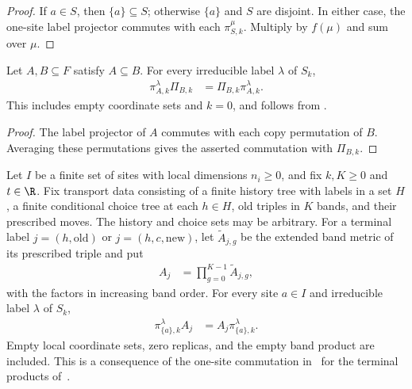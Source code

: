 \begin{proof}
    \leanok
    If $a\in S$, then $\{a\}\subseteq S$; otherwise $\{a\}$ and $S$
    are disjoint. In either case, the one-site label projector commutes
    with each $\pi^\mu_{S,k}$. Multiply by $f(\mu)$ and sum over $\mu$.
\end{proof}


\begin{theorem}
    \label{thm:nested_label_projector_symmetry}
    \leanok
    Let $A,B\subseteq F$ satisfy $A\subseteq B$. For every irreducible
    label $\lambda$ of $S_k$,
    \begin{align}
        \pi^\lambda_{A,k}\Pi_{B,k}
         & =\Pi_{B,k}\pi^\lambda_{A,k}.
    \end{align}
    This includes empty coordinate sets and $k=0$, and follows from
    \cite[Lemma~6.1(2)]{OpenAI2026AreaLaw}.
\end{theorem}

\begin{proof}
    \leanok
    The label projector of $A$ commutes with each copy permutation of
    $B$. Averaging these permutations gives the asserted commutation
    with $\Pi_{B,k}$.
\end{proof}


\begin{theorem}
    \label{thm:transport_input_singleton_label_commutation}
    \leanok
    Let $I$ be a finite set of sites with local dimensions $n_i\ge0$,
    and fix $k,K\ge0$ and $t\in\R$. Fix transport data consisting of
    a finite history tree with labels in a set $H$, a finite conditional
    choice tree at each $h\in H$, old triples in $K$ bands, and their
    prescribed moves. The history and choice sets may be arbitrary.
    For a terminal label $j=(h,\mathrm{old})$ or $j=(h,c,\mathrm{new})$,
    let $\widetilde A_{j,g}$ be the extended band metric of its prescribed
    triple and put
    \begin{align*}
        A_j & =\prod_{g=0}^{K-1}\widetilde A_{j,g},
    \end{align*}
    with the factors in increasing band order. For every site $a\in I$
    and irreducible label $\lambda$ of $S_k$,
    \begin{align*}
        \pi^\lambda_{\{a\},k}A_j
         & =A_j\pi^\lambda_{\{a\},k}.
    \end{align*}
    Empty local coordinate sets, zero replicas, and the empty band
    product are included. This is a consequence of the one-site
    commutation in~\cite[Lemma~6.1(2)]{OpenAI2026AreaLaw} for the terminal
    products of~\cite[Proposition~7.4]{OpenAI2026AreaLaw}.
\end{theorem}

